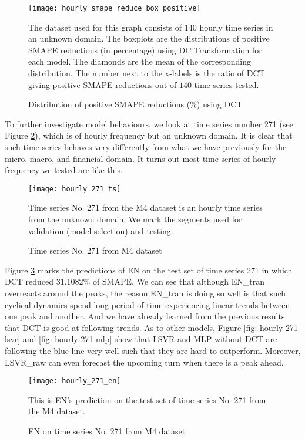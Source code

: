 \begin{figure}[H]
    \centering
    \texttt{[image: hourly\_smape\_reduce\_box\_positive]}
    \caption{Distribution of positive SMAPE reductions (\%) using DCT}
    {\raggedright \footnotesize The dataset used for this graph consists of $140$ hourly time series in an unknown domain. The boxplots are the distributions of positive SMAPE reductions (in percentage) using DC Transformation for each model. The diamonds are the mean of the corresponding distribution. The number next to the x-labels is the ratio of DCT giving positive SMAPE reductions out of $140$ time series tested.\par}
    \label{fig: hourly positive smape reduce box}
\end{figure}

To further investigate model behaviours, we look at time series number 271 (see Figure \ref{fig: hourly 271 ts}), which is of hourly frequency but an unknown domain. It is clear that such time series behaves very differently from what we have previously for the micro, macro, and financial domain. It turns out most time series of hourly frequency we tested are like this.
\begin{figure}[H]
    \centering
    \texttt{[image: hourly\_271\_ts]}
    \caption{Time series No. 271 from M4 dataset}
    {\raggedright \footnotesize Time series No. 271 from the M4 dataset is an hourly time series from the unknown domain. We mark the segments used for validation (model selection) and testing.\par}
    \label{fig: hourly 271 ts}
\end{figure}
Figure \ref{fig: hourly 271 en} marks the predictions of EN on the test set of time series 271 in which DCT reduced 31.1082\% of SMAPE. We can see that although EN\_tran overreacts around the peaks, the reason EN\_tran is doing so well is that such cyclical dynamics spend long period of time experiencing linear trends between one peak and another. And we have already learned from the previous results that DCT is good at following trends. As to other models, Figure \ref{fig: hourly 271 lsvr} and \ref{fig: hourly 271 mlp} show that LSVR and MLP without DCT are following the blue line very well such that they are hard to outperform. Moreover, LSVR\_raw can even forecast the upcoming turn when there is a peak ahead.
\begin{figure}[H]
    \centering
    \texttt{[image: hourly\_271\_en]}
    \caption{EN on time series No. 271 from M4 dataset}
    {\raggedright \footnotesize This is EN's prediction on the test set of time series No. 271 from the M4 dataset.  \par}
    \label{fig: hourly 271 en}
\end{figure}
